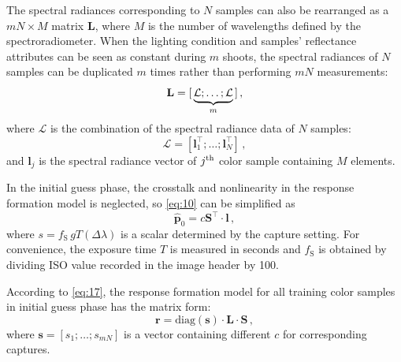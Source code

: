 \documentclass[9pt,twocolumn,twoside]{osajnl}
\providecommand{\DIFadd}[1]{{\protect\color{blue}\uwave{#1}}} %
\providecommand{\DIFdel}[1]{{\protect\color{red}\sout{#1}}}                      %
\providecommand{\DIFaddbegin}{} %
\providecommand{\DIFaddend}{} %
\providecommand{\DIFdelbegin}{} %
\providecommand{\DIFdelend}{} %
\begin{document}
The spectral radiances corresponding to $N$ samples can also be rearranged as a $mN\times{}M$ matrix $\mathbf{L}$, where $M$ is the number of wavelengths defined by the spectroradiometer. When the lighting condition and samples’ reflectance attributes can be seen as constant during $m$ shoots, the spectral radiances of $N$ samples can be duplicated $m$ times rather than performing $mN$ measurements:
\begin{equation}
\mathbf{L} = {\large[}\underbrace{\mathcal{L};\ldots;\mathcal{L}}_m{\large]}\,,
\label{eq:15}
\end{equation}
where $\mathcal{L}$ is the combination of the spectral radiance data of $N$ samples:
\begin{equation}
\mathcal{L} = \left[\mathbf{l}_1^\intercal;\ldots;\mathbf{l}_N^\intercal\right]\,,
\label{eq:16}
\end{equation}
and $\mathbf{l}_j$ is the spectral radiance vector of $j\textsuperscript{th}$ color sample containing $M$ elements.

In the initial guess phase, the crosstalk and nonlinearity in the response formation model is neglected, so \eqref{eq:10} can be simplified as
\begin{equation}
\mathbf{\hat{p}}_0 = c\mathbf{S}^\intercal\cdot\mathbf{l}\,,
\label{eq:17}
\end{equation}
where \DIFdelbegin \DIFdel{$s = f_\text{S}\,gT(\Delta\lambda)$ }\DIFdelend \DIFaddbegin \DIFadd{$c = f_\text{S}\,gt(\Delta\lambda)$ }\DIFaddend is a scalar determined by the capture setting. For convenience, the exposure time $T$ is measured in seconds and $f_\text{S}$ is obtained by dividing ISO value recorded in the image header by 100.

According to \eqref{eq:17}, the response formation model for all training color samples in initial guess phase has the matrix form:
\begin{equation}
\mathbf{r} = \text{diag}(\mathbf{s})\cdot\mathbf{L}\cdot\mathbf{S}\,,
\label{eq:18}
\end{equation}
where $\mathbf{s} = \left[s_1;\ldots;s_{mN}\right]$ is a vector containing different $c$ for corresponding captures.
\end{document}
